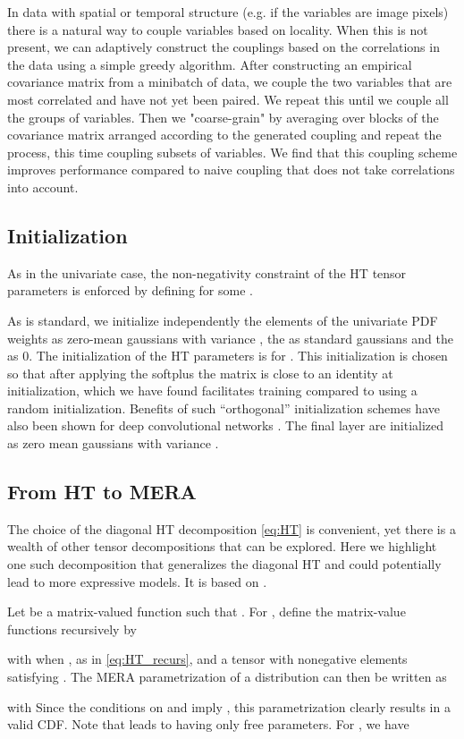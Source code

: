 \documentclass{article}
\begin{document}
In data with spatial or temporal structure (e.g. if the variables are image pixels) there is a natural way to couple variables based on locality. When this is not present, we can adaptively construct the couplings based on the correlations in the data using a simple greedy algorithm. After constructing an empirical covariance matrix from a minibatch of data, we couple the two variables that are most correlated and have not yet been paired. We repeat this until we couple all the groups of variables. Then we "coarse-grain" by averaging over blocks of the covariance matrix arranged according to the generated coupling and repeat the process, this time coupling subsets of variables. We find that this coupling scheme improves performance compared to naive coupling that does not take correlations into account. 

\subsection{Initialization}

As in the univariate case, the non-negativity constraint of the HT tensor parameters  is enforced by defining  for some . 

As is standard, we initialize independently the elements of the univariate PDF weights  as zero-mean gaussians with variance , the  as standard gaussians and the  as 0. The initialization of the HT parameters is  for . This initialization is chosen so that after applying the softplus the matrix  is close to an identity at initialization, which we have found facilitates training compared to using a random initialization. Benefits of such ``orthogonal'' initialization schemes have also been shown for deep convolutional networks \cite{xiao2018dynamical, Blumenfeld2020-lu}. The final layer  are initialized as zero mean gaussians with variance .  

\subsection{From HT to MERA}

The choice of the diagonal HT decomposition \cref{eq:HT} is convenient, yet there is a wealth of other tensor decompositions that can be explored. Here we highlight one such decomposition that generalizes the diagonal HT and could potentially lead to more expressive models. It is based on \cite{Giovannetti2008-pk}. 

Let  be a matrix-valued function such that .
For , define the matrix-value functions  recursively by 

with  when ,  as in \eqref{eq:HT_recurs}, and  a  tensor with nonegative elements satisfying .
The MERA parametrization of a distribution can then be written as

with Since the conditions on  and  imply , this parametrization clearly results in a valid CDF.
Note that  leads to  having only  free parameters.
For , we have
  
\end{document}
